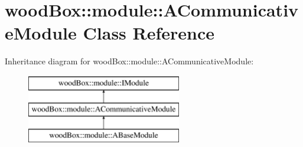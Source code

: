 \hypertarget{classwood_box_1_1module_1_1_a_communicative_module}{}\section{wood\+Box\+:\+:module\+:\+:A\+Communicative\+Module Class Reference}
\label{classwood_box_1_1module_1_1_a_communicative_module}
Inheritance diagram for wood\+Box\+:\+:module\+:\+:A\+Communicative\+Module\+:\begin{figure}[H]
\begin{center}
\leavevmode
\includegraphics[height=3.000000cm]{classwood_box_1_1module_1_1_a_communicative_module}
\end{center}
\end{figure}
